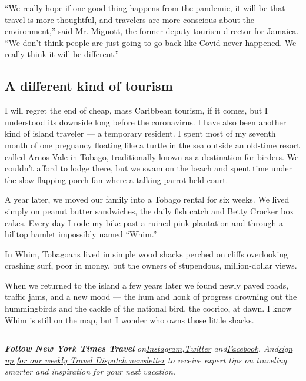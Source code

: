 ``We really hope if one good thing happens from the pandemic, it will be
that travel is more thoughtful, and travelers are more conscious about
the environment,'' said Mr. Mignott, the former deputy tourism director
for Jamaica. ``We don't think people are just going to go back like
Covid never happened. We really think it will be different.''

\hypertarget{a-different-kind-of-tourism}{%
\subsection{A different kind of
tourism}\label{a-different-kind-of-tourism}}

I will regret the end of cheap, mass Caribbean tourism, if it comes, but
I understood its downside long before the coronavirus. I have also been
another kind of island traveler --- a temporary resident. I spent most
of my seventh month of one pregnancy floating like a turtle in the sea
outside an old-time resort called Arnos Vale in Tobago, traditionally
known as a destination for birders. We couldn't afford to lodge there,
but we swam on the beach and spent time under the slow flapping porch
fan where a talking parrot held court.

A year later, we moved our family into a Tobago rental for six weeks. We
lived simply on peanut butter sandwiches, the daily fish catch and Betty
Crocker box cakes. Every day I rode my bike past a ruined pink
plantation and through a hilltop hamlet impossibly named ``Whim.''

In Whim, Tobagoans lived in simple wood shacks perched on cliffs
overlooking crashing surf, poor in money, but the owners of stupendous,
million-dollar views.

When we returned to the island a few years later we found newly paved
roads, traffic jams, and a new mood --- the hum and honk of progress
drowning out the hummingbirds and the cackle of the national bird, the
cocrico, at dawn. I know Whim is still on the map, but I wonder who owns
those little shacks.

\begin{center}\rule{0.5\linewidth}{\linethickness}\end{center}

\emph{\textbf{Follow New York Times Travel}}
\emph{on}\href{https://www.instagram.com/nytimestravel/}{\emph{Instagram}}\emph{,}\href{https://twitter.com/nytimestravel}{\emph{Twitter}}
\emph{and}\href{https://www.facebookcorewwwi.onion/nytimestravel/}{\emph{Facebook}}\emph{.
And}\href{https://www.nytimes3xbfgragh.onion/newsletters/traveldispatch}{\emph{sign
up for our weekly Travel Dispatch newsletter}} \emph{to receive expert
tips on traveling smarter and inspiration for your next vacation.}

